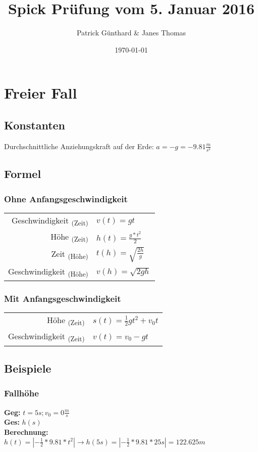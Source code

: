 \documentclass{article}
\title{Spick Prüfung vom 5. Januar 2016}
\author{Patrick Günthard \& Janes Thomas}
\date{\today}
\begin{document}
	\maketitle
	
	\tableofcontents
	
	\section{Freier Fall}
	
	\subsection{Konstanten}
	
	Durchschnittliche Anziehungskraft auf der Erde: \(a = -g = -9.81\frac{m}{s^2}\)
	
	\subsection{Formel}
	
	\subsubsection{Ohne Anfangsgeschwindigkeit}
	
	\begin{tabular}{r l}
		Geschwindigkeit \textsubscript{(Zeit)} & \(v(t) = gt\) \\
		Höhe \textsubscript{(Zeit)} & \( h(t) = \frac{g * t^2}{2}\)\\
		Zeit \textsubscript{(Höhe)}	 & \(t(h) = \sqrt{\frac{2h}{g}} \)\\
		Geschwindigkeit \textsubscript{(Höhe)} & \(v(h) = \sqrt{2gh}\) \\
	
	\end{tabular}
	
	\subsubsection{Mit Anfangsgeschwindigkeit}
	
	\begin{tabular}{r l}
		Höhe \textsubscript{(Zeit)} & \(s(t) = \frac{1}{2}gt^2 + v_0t \) \\
		Geschwindigkeit \textsubscript{(Zeit)} & \(v(t) = v_0 - gt\) \\
	\end{tabular}
	
	\subsection{Beispiele}
	
	\subsubsection{Fallhöhe}
	
	\textbf{Geg:} \(t = 5s; v_0 = 0\frac{m}{s}\)\\
	\textbf{Ges:} \(h (s)\)\\
	
	\textbf{Berechnung:}\\
	\(h (t) = |-\frac{1}{2} * 9.81 * t^2 | \rightarrow h(5s) = |-\frac{1}{2} * 9.81 * 25s | = 122.625m\)
\end{document}
